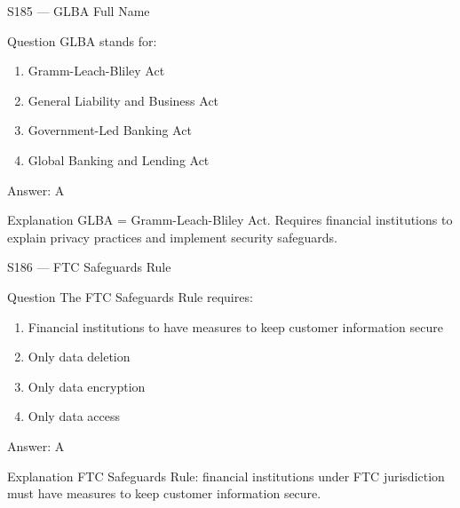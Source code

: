 \documentclass[aspectratio=169,8pt]{beamer}
\begin{document}
	\begin{frame}{S185 --- GLBA Full Name}
		\begin{block}{Question}
			GLBA stands for:
			\begin{enumerate}
				\item Gramm-Leach-Bliley Act
				\item General Liability and Business Act
				\item Government-Led Banking Act
				\item Global Banking and Lending Act
			\end{enumerate}
		\end{block}
		\begin{exampleblock}{Answer: A}\end{exampleblock}
		\begin{block}{Explanation}
			GLBA = Gramm-Leach-Bliley Act. Requires financial institutions to explain privacy practices and implement security safeguards.
		\end{block}
	\end{frame}
	
	\begin{frame}{S186 --- FTC Safeguards Rule}
		\begin{block}{Question}
			The FTC Safeguards Rule requires:
			\begin{enumerate}
				\item Financial institutions to have measures to keep customer information secure
				\item Only data deletion
				\item Only data encryption
				\item Only data access
			\end{enumerate}
		\end{block}
		\begin{exampleblock}{Answer: A}\end{exampleblock}
		\begin{block}{Explanation}
			FTC Safeguards Rule: financial institutions under FTC jurisdiction must have measures to keep customer information secure.
		\end{block}
	\end{frame}
	
\end{document}
